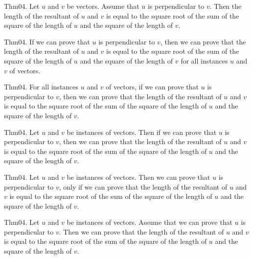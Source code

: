 \documentclass{article}
\begin{document}
Thm04. Let $u$ and $v$ be vectors. Assume that $u$ is perpendicular to $v$. Then the length of the resultant of $u$ and $v$ is equal to the square root of the sum of the square of the length of $u$ and the square of the length of $v$.

Thm04. If we can prove that $u$ is perpendicular to $v$, then we can prove that the length of the resultant of $u$ and $v$ is equal to the square root of the sum of the square of the length of $u$ and the square of the length of $v$ for all instances $u$ and $v$ of vectors.

Thm04. For all instances $u$ and $v$ of vectors, if we can prove that $u$ is perpendicular to $v$, then we can prove that the length of the resultant of $u$ and $v$ is equal to the square root of the sum of the square of the length of $u$ and the square of the length of $v$.

Thm04. Let $u$ and $v$ be instances of vectors. Then if we can prove that $u$ is perpendicular to $v$, then we can prove that the length of the resultant of $u$ and $v$ is equal to the square root of the sum of the square of the length of $u$ and the square of the length of $v$.

Thm04. Let $u$ and $v$ be instances of vectors. Then we can prove that $u$ is perpendicular to $v$, only if we can prove that the length of the resultant of $u$ and $v$ is equal to the square root of the sum of the square of the length of $u$ and the square of the length of $v$.

Thm04. Let $u$ and $v$ be instances of vectors. Assume that we can prove that $u$ is perpendicular to $v$. Then we can prove that the length of the resultant of $u$ and $v$ is equal to the square root of the sum of the square of the length of $u$ and the square of the length of $v$.
\end{document}

